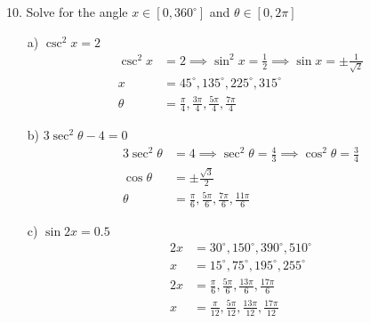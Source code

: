 \documentclass{article}
\newenvironment{solution}{\color{solutioncolor}}{}
\begin{document}
10. Solve for the angle \( x \in [0, 360^{\circ}] \) and \( \theta \in [0, 2\pi] \)
\begin{enumerate}
    \item[a)] \( \csc^2 x = 2 \)
    \begin{solution}
        \begin{align*}
            \csc^2 x &= 2 \implies \sin^2 x = \frac{1}{2} \implies \sin x = \pm \frac{1}{\sqrt{2}} \\
            x &= 45^{\circ}, 135^{\circ}, 225^{\circ}, 315^{\circ} \\
            \theta &= \frac{\pi}{4}, \frac{3\pi}{4}, \frac{5\pi}{4}, \frac{7\pi}{4}
        \end{align*}
    \end{solution}
    \item[b)] \( 3\sec^2 \theta - 4 = 0 \)
    \begin{solution}
        \begin{align*}
            3\sec^2 \theta &= 4 \implies \sec^2 \theta = \frac{4}{3} \implies \cos^2 \theta = \frac{3}{4} \\
            \cos \theta &= \pm \frac{\sqrt{3}}{2} \\
            \theta &= \frac{\pi}{6}, \frac{5\pi}{6}, \frac{7\pi}{6}, \frac{11\pi}{6}
        \end{align*}
    \end{solution}
    \item[c)] \( \sin 2x = 0.5 \)
    \begin{solution}
        \begin{align*}
            2x &= 30^{\circ}, 150^{\circ}, 390^{\circ}, 510^{\circ} \\
            x &= 15^{\circ}, 75^{\circ}, 195^{\circ}, 255^{\circ} \\
            2x &= \frac{\pi}{6}, \frac{5\pi}{6}, \frac{13\pi}{6}, \frac{17\pi}{6} \\
            x &= \frac{\pi}{12}, \frac{5\pi}{12}, \frac{13\pi}{12}, \frac{17\pi}{12}
        \end{align*}
    \end{solution}
\end{enumerate}
\end{document}
